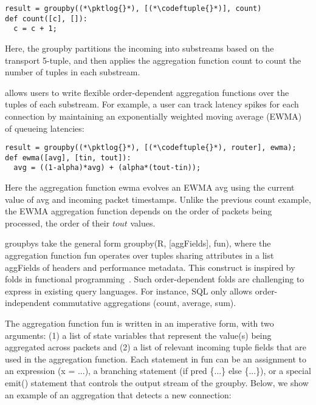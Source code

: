 \begin{lstlisting}
result = groupby((*\pktlog{}*), [(*\codeftuple{}*)], count)
def count([c], []):
  c = c + 1;
\end{lstlisting}

Here, the {\ct groupby} partitions the incoming {\ct \pktlog} into substreams
based on the transport 5-tuple, and then applies the aggregation function {\ct
count} to count the number of tuples in each substream.

\TheSystem allows users to write flexible order-dependent aggregation functions
over the tuples of each substream. For example, a user can track latency spikes
for each connection by maintaining an exponentially weighted moving average
(EWMA) of queueing latencies:

\begin{lstlisting}
result = groupby((*\pktlog{}*), [(*\codeftuple{}*), router], ewma);
def ewma([avg], [tin, tout]):
  avg = ((1-alpha)*avg) + (alpha*(tout-tin));
\end{lstlisting}

Here the aggregation function {\ct ewma} evolves an EWMA {\ct avg} using the
current value of {\ct avg} and incoming packet timestamps. Unlike the previous
{\ct count} example, the EWMA aggregation function depends on the order of
packets being processed, \ie the order of their $tout$ values.

{\ct groupby}s take the general form {\ct groupby(R, [aggFields], fun)}, where
the aggregation function {\ct fun} operates over tuples sharing attributes in a
list {\ct aggFields} of headers and performance metadata. This construct is
inspired by folds in functional
programming~\cite{comprehensive-comprehensions}.  Such order-dependent folds
are challenging to express in existing query languages. For instance, SQL only
allows order-independent commutative aggregations (\eg count, average, sum).

The aggregation function {\ct fun} is written in an imperative form, with two
arguments: (1) a list of state variables that represent the value(s) being
aggregated across packets and (2) a list of relevant incoming tuple fields that
are used in the aggregation function. Each statement in {\ct fun} can be an
assignment to an expression ({\ct x = ...}), a branching statement ({\ct if
pred \{...\} else \{...\}}), or a special {\ct emit()} statement that controls
the output stream of the {\ct groupby}. Below, we show an example of an
aggregation that detects a new connection:

